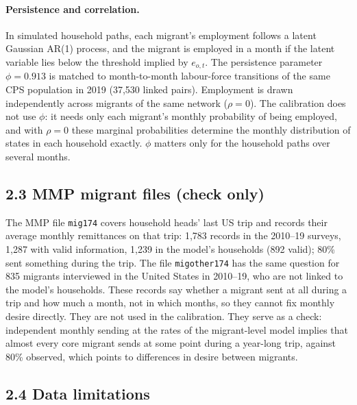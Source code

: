 \documentclass[11pt]{article}
\begin{document}
\paragraph{Persistence and correlation.} In simulated household paths, each migrant's employment follows a latent Gaussian AR(1) process, and the migrant is employed in a month if the latent variable lies below the threshold implied by $e_{o,t}$. The persistence parameter $\phi = 0.913$ is matched to month-to-month labour-force transitions of the same CPS population in 2019 (37,530 linked pairs). Employment is drawn independently across migrants of the same network ($\rho = 0$). The calibration does not use $\phi$: it needs only each migrant's monthly probability of being employed, and with $\rho = 0$ these marginal probabilities determine the monthly distribution of states in each household exactly. $\phi$ matters only for the household paths over several months.

\subsection*{2.3 MMP migrant files (check only)}

The MMP file \texttt{mig174} covers household heads' last US trip and records their average monthly remittances on that trip: 1,783 records in the 2010--19 surveys, 1,287 with valid information, 1,239 in the model's households (892 valid); 80\% sent something during the trip. The file \texttt{migother174} has the same question for 835 migrants interviewed in the United States in 2010--19, who are not linked to the model's households. These records say whether a migrant sent at all during a trip and how much a month, not in which months, so they cannot fix monthly desire directly. They are not used in the calibration. They serve as a check: independent monthly sending at the rates of the migrant-level model implies that almost every core migrant sends at some point during a year-long trip, against 80\% observed, which points to differences in desire between migrants.

\subsection*{2.4 Data limitations}
\end{document}
